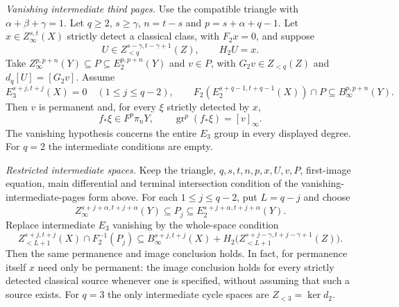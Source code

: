 \begin{corollary}
\label{sem:ProofTools:coverage-finite-lift-permanence}

\textit{Vanishing intermediate third pages.}
Use the compatible triangle with $\alpha+\beta+\gamma=1$.
Let $q\ge2$, $s\ge\gamma$, $n=t-s$ and $p=s+\alpha+q-1$.
Let $x\in Z_\infty^{s,t}(X)$ strictly detect a classical class,
with $F_2x=0$, and suppose
\[
 U\in Z_{<q}^{s-\gamma,t-\gamma+1}(Z),\qquad H_2U=x.
\]
Take $Z_\infty^{p,p+n}(Y)\subseteq P\subseteq E_2^{p,p+n}(Y)$
and $v\in P$, with $G_2v\in Z_{<q}(Z)$ and
$d_q[U]=[G_2v]$. Assume
\[
 E_3^{s+j,t+j}(X)=0\quad(1\le j\le q-2),\qquad
 F_2(E_2^{s+q-1,t+q-1}(X))\cap P\subseteq B_\infty^{p,p+n}(Y).
\]
Then $v$ is permanent and, for every $\xi$ strictly detected by $x$,
\[
 f_*\xi\in F^p\pi_nY,\qquad
 \operatorname{gr}^{p}(f_*\xi)=[v]_\infty.
\]
The vanishing hypothesis concerns the entire $E_3$ group
in every displayed degree.
For $q=2$ the intermediate conditions are empty.

\textit{Restricted intermediate spaces.}
Keep the triangle, $q,s,t,n,p,x,U,v,P$, first-image equation,
main differential and terminal intersection condition of
the vanishing-intermediate-pages form above.
For each $1\le j\le q-2$, put $L=q-j$ and choose
\[
 Z_\infty^{s+j+\alpha,t+j+\alpha}(Y)
 \subseteq P_j\subseteq E_2^{s+j+\alpha,t+j+\alpha}(Y).
\]
Replace intermediate $E_3$ vanishing by the whole-space condition
\[
 Z_{<L+1}^{s+j,t+j}(X)\cap F_2^{-1}(P_j)
 \subseteq B_\infty^{s+j,t+j}(X)
 +H_2\bigl(Z_{<L+1}^{s+j-\gamma,t+j-\gamma+1}(Z)\bigr).
\]
Then the same permanence and image conclusion holds.
In fact, for permanence itself $x$ need only be permanent: the image
conclusion holds for every strictly detected classical source whenever
one is specified, without assuming that such a source exists.
For $q=3$ the only intermediate cycle spaces are $Z_{<3}=\ker d_2$.
\end{corollary}
